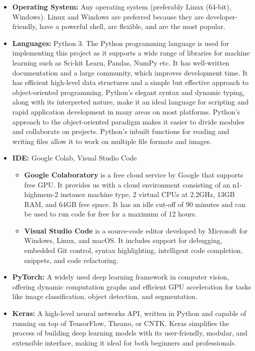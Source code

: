 \documentclass[11pt]{report}
\begin{document}
\begin{itemize}
    \item \textbf{Operating System:} Any operating system (preferably Linux (64-bit), Windows). Linux and Windows are preferred because they are developer-friendly, have a powerful shell, are flexible, and are the most popular.
    
    \item \textbf{Languages:} Python 3. The Python programming language is used for implementing this project as it supports a wide range of libraries for machine learning such as Sci-kit Learn, Pandas, NumPy etc. It has well-written documentation and a large community, which improves development time. It has efficient high-level data structures and a simple but effective approach to object-oriented programming. Python's elegant syntax and dynamic typing, along with its interpreted nature, make it an ideal language for scripting and rapid application development in many areas on most platforms. Python's approach to the object-oriented paradigm makes it easier to divide modules and collaborate on projects. Python's inbuilt functions for reading and writing files allow it to work on multiple file formats and images.
     \item \textbf{IDE:} Google Colab, Visual Studio Code
    \begin{itemize}
        \item \textbf{Google Colaboratory} is a free cloud service by Google that supports free GPU. It provides us with a cloud environment consisting of an n1-highmem-2 instance machine type, 2 virtual CPUs at 2.2GHz, 13GB RAM, and 64GB free space. It has an idle cut-off of 90 minutes and can be used to run code for free for a maximum of 12 hours.
        
        \item \textbf{Visual Studio Code} is a source-code editor developed by Microsoft for Windows, Linux, and macOS. It includes support for debugging, embedded Git control, syntax highlighting, intelligent code completion, snippets, and code refactoring.
    \end{itemize}

        \item \textbf{PyTorch:} A widely used deep learning framework in computer vision, offering dynamic computation graphs and efficient GPU acceleration for tasks like image classification, object detection, and segmentation.
    
        \item \textbf{Keras:} A high-level neural networks API, written in Python and capable of running on top of TensorFlow, Theano, or CNTK. Keras simplifies the process of building deep learning models with its user-friendly, modular, and extensible interface, making it ideal for both beginners and professionals.
        

\end{itemize}
\end{document}
